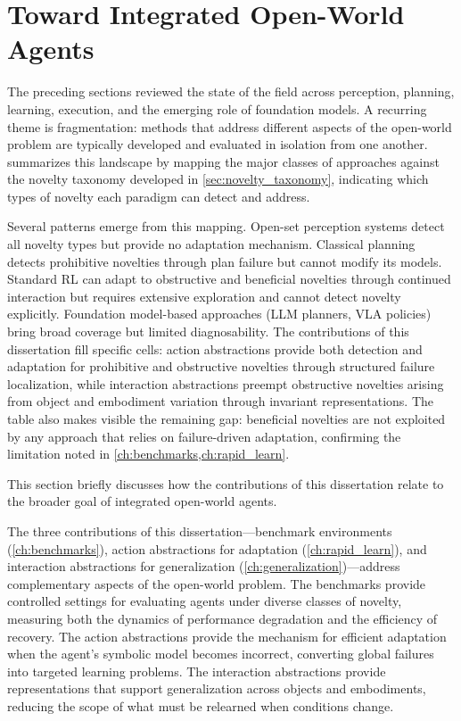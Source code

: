 \section{Toward Integrated Open-World Agents}
\label{sec:perspectives_integration}

The preceding sections reviewed the state of the field across perception, planning, learning, execution, and the emerging role of foundation models. A recurring theme is fragmentation: methods that address different aspects of the open-world problem are typically developed and evaluated in isolation from one another.  summarizes this landscape by mapping the major classes of approaches against the novelty taxonomy developed in \cref{sec:novelty_taxonomy}, indicating which types of novelty each paradigm can detect and address.



Several patterns emerge from this mapping. Open-set perception systems detect all novelty types but provide no adaptation mechanism. Classical planning detects prohibitive novelties through plan failure but cannot modify its models. Standard RL can adapt to obstructive and beneficial novelties through continued interaction but requires extensive exploration and cannot detect novelty explicitly. Foundation model-based approaches (LLM planners, VLA policies) bring broad coverage but limited diagnosability. The contributions of this dissertation fill specific cells: action abstractions provide both detection and adaptation for prohibitive and obstructive novelties through structured failure localization, while interaction abstractions preempt obstructive novelties arising from object and embodiment variation through invariant representations. The table also makes visible the remaining gap: beneficial novelties are not exploited by any approach that relies on failure-driven adaptation, confirming the limitation noted in \cref{ch:benchmarks,ch:rapid_learn}.

This section briefly discusses how the contributions of this dissertation relate to the broader goal of integrated open-world agents.

The three contributions of this dissertation---benchmark environments (\cref{ch:benchmarks}), action abstractions for adaptation (\cref{ch:rapid_learn}), and interaction abstractions for generalization (\cref{ch:generalization})---address complementary aspects of the open-world problem. The benchmarks provide controlled settings for evaluating agents under diverse classes of novelty, measuring both the dynamics of performance degradation and the efficiency of recovery. The action abstractions provide the mechanism for efficient adaptation when the agent's symbolic model becomes incorrect, converting global failures into targeted learning problems. The interaction abstractions provide representations that support generalization across objects and embodiments, reducing the scope of what must be relearned when conditions change.

